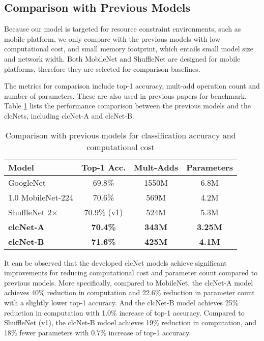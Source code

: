 \documentclass[10pt,twocolumn,letterpaper]{article}
\begin{document}
\subsection{Comparison with Previous Models}
Because our model is targeted for resource constraint environments, such as mobile platform, we only compare with the previous models with low computational cost, and small memory footprint, which entails small model size and network width. Both MobileNet\cite{mobilenet2017howard} and ShuffleNet\cite{shufflenet2017xiangyu} are designed for mobile platforms, therefore they are selected for comparison baselines.

The metrics for comparison include top-1 accuracy, mult-add operation count and number of parameters. These are also used in previous papers for benchmark.  Table \ref{tb:exp_comp} lists the performance comparison between the previous models and the clcNets, including clcNet-A and clcNet-B.

\begin{table}[h!]\small
\begin{center}
\begin{tabular}{l|c|c|c}
\hline
Model  & Top-1 Acc. & Mult-Adds & Parameters \\
\hline\hline
GoogleNet  & 69.8\%  & 1550M & 6.8M \\
1.0 MobileNet-224  & 70.6\%  & 569M & 4.2M \\
ShuffleNet 2$\times$  & 70.9\% (v1)  & 524M & 5.3M \\
\hline
\textbf{clcNet-A}  & \textbf{70.4\%}  & \textbf{343M} & \textbf{3.25M} \\
\textbf{clcNet-B}  & \textbf{71.6\%}  & \textbf{425M} & \textbf{4.1M} \\
\hline
\end{tabular}
\end{center}
\caption{Comparison with previous models for classification accuracy and computational cost}
\label{tb:exp_comp}
\end{table}

It can be observed that the developed clcNet models achieve significant improvements for reducing computational cost and parameter count compared to previous models. More specifically, 
compared to MobileNet, the clcNet-A model achieves 40\% reduction in computation and 22.6\% reduction in parameter count with a slightly lower top-1 accuracy. And the clcNet-B model achieves 25\% reduction in computation with 1.0\% increase of top-1 accuracy. Compared to ShuffleNet (v1\cite{shufflenet2017xiangyu}), the clcNet-B mdoel achieves 19\% reduction in computation, and 18\% fewer parameters with 0.7\% increase of top-1 accuracy.  
\end{document}
